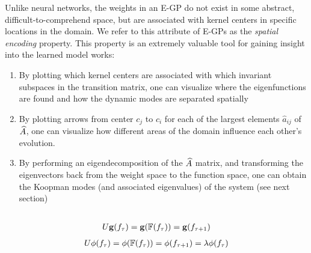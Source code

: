Unlike neural networks, the weights in an E-GP do not exist in some abstract, difficult-to-comprehend space, but are associated with kernel centers in specific locations in the domain. We refer to this attribute of E-GPs as the \emph{spatial encoding} property. This property is an extremely valuable tool for gaining insight into the learned model works:
\begin{enumerate}
	\item By plotting which kernel centers are associated with which invariant subspaces in the transition matrix, one can visualize where the eigenfunctions are found and how the dynamic modes are separated spatially
	\item By plotting arrows from center $c_j$ to $c_i$ for each of the largest elements $\hat a_{ij}$ of $\widehat{A}$, one can visualize how different areas of the domain influence each other's evolution.
	\item By performing an eigendecomposition of the $\widehat{A}$ matrix, and transforming the eigenvectors back from the weight space to the function space, one can obtain the Koopman modes (and associated eigenvalues) of the system (see next section)
\end{enumerate}


\subsection{}

\begin{align} \eqlabel{koopman_operator}
U \mathbf{g}(f_{\tindex}) = \mathbf{g}(\mathbb{F}(f_{\tindex})) = \mathbf{g}(f_{\tindex+1})
\end{align}
\begin{align} \eqlabel{koopman_eigenfunctions}
U \phi(f_{\tindex}) = \phi(\mathbb{F}(f_{\tindex})) = \phi(f_{\tindex+1}) = \lambda \phi(f_{\tindex})
\end{align}


